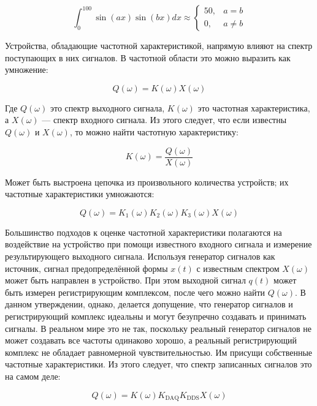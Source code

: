\documentclass{report}
\begin{document}
\begin{equation}
\int_{0}^{100} \sin(ax) \sin(bx) dx \approx
\begin{cases}
50, & a = b \\
0, & a \ne b
\end{cases}
\end{equation}

Устройства, обладающие частотной характеристикой, напрямую влияют на спектр поступающих в них сигналов. В частотной области это можно выразить как умножение:

\begin{equation}
Q(\omega) = K(\omega) X(\omega)
\end{equation}

Где $Q(\omega)$ это спектр выходного сигнала, $K(\omega)$ это частотная характеристика, а $X(\omega)$ --- спектр входного сигнала. Из этого следует, что если известны $Q(\omega)$ и $X(\omega)$, то можно найти частотную характеристику:

\begin{equation}
K(\omega) = \frac{Q(\omega)}{X(\omega)}
\end{equation}

Может быть выстроена цепочка из произвольного количества устройств; их частотные характеристики умножаются:

\begin{equation}
Q(\omega) = K_1(\omega) K_2(\omega) K_3(\omega) X(\omega)
\end{equation}

Большинство подходов к оценке частотной характеристики полагаются на воздействие на устройство при помощи известного входного сигнала и измерение результирующего выходного сигнала. Используя генератор сигналов как источник, сигнал предопределённой формы $x(t)$ с известным спектром $X(\omega)$ может быть направлен в устройство. При этом выходной сигнал $q(t)$ может быть измерен регистрирующим комплексом, после чего можно найти $Q(\omega)$. В данном утверждении, однако, делается допущение, что генератор сигналов и регистрирующий комплекс идеальны и могут безупречно создавать и принимать сигналы. В реальном мире это не так, поскольку реальный генератор сигналов не может создавать все частоты одинаково хорошо, а реальный регистрирующий комплекс не обладает равномерной чувствительностью. Им присущи собственные частотные характеристики. Из этого следует, что спектр записанных сигналов это на самом деле:

\begin{equation}
Q(\omega) = K(\omega) K_\text{DAQ} K_\text{DDS} X(\omega)
\end{equation}
\end{document}
